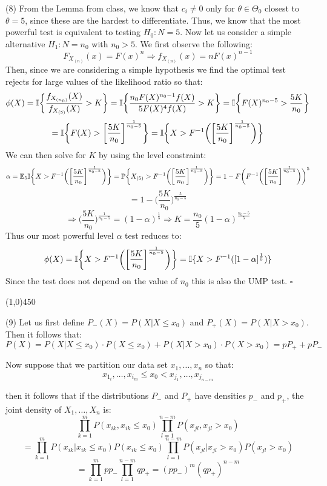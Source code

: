 \documentclass[12pt]{article}
\begin{document}
\pagebreak
\noindent
(8) From the Lemma from class, we know that $c_i \neq 0$ only for $\theta \in \Theta_0$ closest to $\theta = 5$, since these are the hardest to differentiate. Thus, we know that the most powerful test is equivalent to testing $H_0: N=5$. Now let us consider a simple alternative $H_1: N = n_0$ with $n_0 > 5$. We first observe the following:
$$F_{X_{(n)}}(x) = F(x)^n \Rightarrow f_{X_{(n)}}(x) = n F(x)^{n-1}$$
Then, since we are considering a simple hypothesis we find the optimal test rejects for large values of the likelihood ratio so that:
$$\phi(X) = \mathbb{I} \biggl\{ \frac{f_{X_{(n_0)}}(X)}{f_{X_{(5)}}(X)} > K \biggr\}
= \mathbb{I} \biggl\{ \frac{n_0 F(X)^{n_0-1} f(X) }{ 5F(X)^4 f(X)} > K \biggr\}
= \mathbb{I} \biggl\{ F(X)^{n_0-5} > \frac{5K}{n_0} \biggr\}$$
$$= \mathbb{I} \biggl\{ F(X) >  \biggl[\frac{5K}{n_0}\biggr]^{\frac{1}{n_0-5}} \biggr\}
= \mathbb{I} \biggl\{ X > F^{-1} \biggl( \biggl[\frac{5K}{n_0}\biggr]^{\frac{1}{n_0-5}} \biggr) \biggr\}$$
We can then solve for $K$ by using the level constraint:
$$\alpha = \mathbb{E}_5 \mathbb{I} \biggl\{ X > F^{-1} \biggl( \biggl[\frac{5K}{n_0}\biggr]^{\frac{1}{n_0-5}} \biggr)\biggr\}
= \mathbb{P} \biggl\{ X_{(5)} > F^{-1} \biggl( \biggl[\frac{5K}{n_0}\biggr]^{\frac{1}{n_0-5}} \biggr)\biggr\}
= 1 - F \biggl(F^{-1} \biggl( \biggl[\frac{5K}{n_0}\biggr]^{\frac{1}{n_0-5}} \biggr)\biggr)^5$$
$$= 1- \biggl(\frac{5K}{n_0}\biggr)^{\frac{5}{n_0-5}}$$
$$\Rightarrow \biggl(\frac{5K}{n_0}\biggr)^{\frac{1}{n_0-5}} = (1-\alpha)^{\frac{1}{5}}
\Rightarrow K = \frac{n_0}{5} (1-\alpha)^{\frac{n_0-5}{5}}$$
Thus our most powerful level $\alpha$ test reduces to:
$$\phi(X) = \mathbb{I} \biggl\{ X > F^{-1} \biggl( \biggl[\frac{5K}{n_0}\biggr]^{\frac{1}{n_0-5}} \biggr) \biggr\}
= \mathbb{I}\{X > F^{-1}( [1-\alpha]^{\frac{1}{5}})\}$$
Since the test does not depend on the value of $n_0$ this is also the UMP test. $\square$

\begin{center}
\line(1,0){450}
\end{center}

\pagebreak
\noindent
(9) Let us first define $P_-(X) = P(X | X \leq x_0)$ and $P_+(X) = P(X | X > x_0)$. Then it follows that:
$$P(X) = P(X | X \leq x_0)\cdot P(X \leq x_0) + P(X | X > x_0)\cdot P(X > x_0) = p P_+ + p P_-$$

\noindent
Now suppose that we partition our data set $x_1, \dots , x_n$ so that:
$$x_{1_i},\dots,x_{i_m} \leq x_0 < x_{j_1},\dots,x_{j_{n-m}}$$

\noindent
then it follows that if the distributions $P_-$ and $P_+$ have densities $p_-$ and $p_+$, the joint density of $X_1,\dots,X_n$ is:
$$\prod_{k=1}^m P(x_{ik}, x_{ik} \leq x_0) \prod_{l=1}^{n-m}  P(x_{jl}, x_{jl} > x_0)$$
$$= \prod_{k=1}^m P(x_{ik}| x_{ik} \leq x_0)P(x_{ik} \leq x_0) \prod_{l=1}^{n-m}  P(x_{jl}| x_{jl} > x_0)P(x_{jl} > x_0)$$
$$= \prod_{k=1}^m p p_- \prod_{l=1}^{n-m}  q p_+
= (p p_-)^m (qp_+)^{n-m}$$
\end{document}
